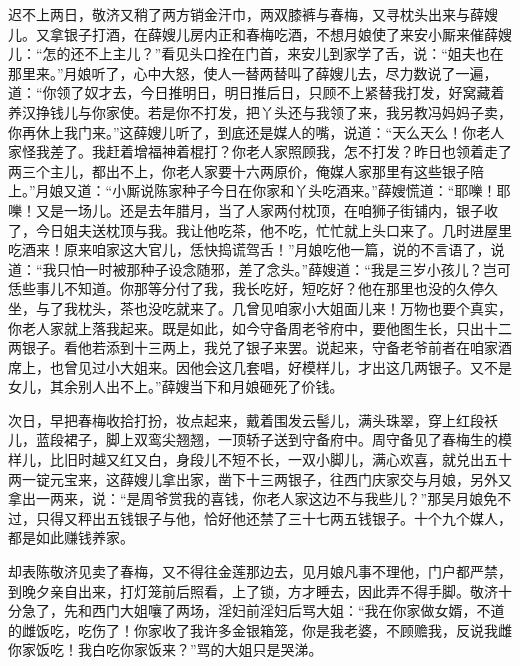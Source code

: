 迟不上两日，敬济又稍了两方销金汗巾，两双膝裤与春梅，又寻枕头出来与薛嫂儿。又拿银子打酒，在薛嫂儿房内正和春梅吃酒，不想月娘使了来安小厮来催薛嫂儿：“怎的还不上主儿？”看见头口拴在门首，来安儿到家学了舌，说：“姐夫也在那里来。”月娘听了，心中大怒，使人一替两替叫了薛嫂儿去，尽力数说了一遍，道：“你领了奴才去，今日推明日，明日推后日，只顾不上紧替我打发，好窝藏着养汉挣钱儿与你家使。若是你不打发，把丫头还与我领了来，我另教冯妈妈子卖，你再休上我门来。”这薛嫂儿听了，到底还是媒人的嘴，说道：“天么天么！你老人家怪我差了。我赶着增福神着棍打？你老人家照顾我，怎不打发？昨日也领着走了两三个主儿，都出不上，你老人家要十六两原价，俺媒人家那里有这些银子陪上。”月娘又道：“小厮说陈家种子今日在你家和丫头吃酒来。”薛嫂慌道：“耶嚛！耶嚛！又是一场儿。还是去年腊月，当了人家两付枕顶，在咱狮子街铺内，银子收了，今日姐夫送枕顶与我。我让他吃茶，他不吃，忙忙就上头口来了。几时进屋里吃酒来！原来咱家这大官儿，恁快捣谎驾舌！”月娘吃他一篇，说的不言语了，说道：“我只怕一时被那种子设念随邪，差了念头。”薛嫂道：“我是三岁小孩儿？岂可恁些事儿不知道。你那等分付了我，我长吃好，短吃好？他在那里也没的久停久坐，与了我枕头，茶也没吃就来了。几曾见咱家小大姐面儿来！万物也要个真实，你老人家就上落我起来。既是如此，如今守备周老爷府中，要他图生长，只出十二两银子。看他若添到十三两上，我兑了银子来罢。说起来，守备老爷前者在咱家酒席上，也曾见过小大姐来。因他会这几套唱，好模样儿，才出这几两银子。又不是女儿，其余别人出不上。”薛嫂当下和月娘砸死了价钱。

次日，早把春梅收拾打扮，妆点起来，戴着围发云髻儿，满头珠翠，穿上红段袄儿，蓝段裙子，脚上双鸾尖翘翘，一顶轿子送到守备府中。周守备见了春梅生的模样儿，比旧时越又红又白，身段儿不短不长，一双小脚儿，满心欢喜，就兑出五十两一锭元宝来，这薛嫂儿拿出家，凿下十三两银子，往西门庆家交与月娘，另外又拿出一两来，说：“是周爷赏我的喜钱，你老人家这边不与我些儿？”那吴月娘免不过，只得又秤出五钱银子与他，恰好他还禁了三十七两五钱银子。十个九个媒人，都是如此赚钱养家。

却表陈敬济见卖了春梅，又不得往金莲那边去，见月娘凡事不理他，门户都严禁，到晚夕亲自出来，打灯笼前后照看，上了锁，方才睡去，因此弄不得手脚。敬济十分急了，先和西门大姐嚷了两场，淫妇前淫妇后骂大姐：“我在你家做女婿，不道的雌饭吃，吃伤了！你家收了我许多金银箱笼，你是我老婆，不顾赡我，反说我雌你家饭吃！我白吃你家饭来？”骂的大姐只是哭涕。

